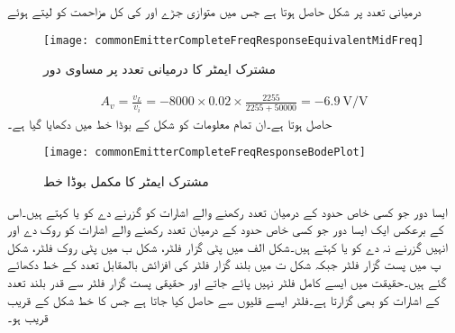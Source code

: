 درمیانی تعدد پر شکل  حاصل ہوتا ہے جس میں متوازی جڑے  اور  کی کل مزاحمت کو  لیتے ہوئے
\begin{figure}
\centering
\texttt{[image: commonEmitterCompleteFreqResponseEquivalentMidFreq]}
\caption{مشترک ایمٹر کا درمیانی تعدد پر مساوی دور}
\label{شکل_تعددی_ردعمل_مشترک_مخارج_مکمل_تعددی_ردعمل_درمیانی_تعددی_مساوی}
\end{figure}
\begin{align*}
A_v=\frac{v_L}{v_i}=-8000 \times 0.02 \times \frac{2255}{2255+50000}=\SI{-6.9}{\volt \per \volt}
\end{align*}
حاصل ہوتا ہے۔ان تمام معلومات کو شکل  کے بوڈا خط میں دکھایا گیا ہے۔ 
\begin{figure}
\centering
\texttt{[image: commonEmitterCompleteFreqResponseBodePlot]}
\caption{مشترک ایمٹر کا مکمل بوڈا خط}
\label{شکل_تعددی_ردعمل_مشترک_مخارج_مکمل_تعددی_ردعمل_مکمل_بوڈا_خط}
\end{figure}
ایسا دور جو کسی خاص حدود کے درمیان تعدد رکھنے والے اشارات کو گزرنے دے کو  یا   کہتے ہیں۔اس کے برعکس ایک ایسا دور جو کسی خاص حدود کے درمیان تعدد رکھنے والے اشارات کو روک دے اور انہیں گزرنے نہ دے کو  یا   کہتے ہیں۔شکل  الف میں پٹی گزار فلٹر، شکل  ب میں پٹی روک فلٹر، شکل  پ میں پست گزار فلٹر جبکہ شکل  ت میں بلند گزار فلٹر  کی افزائش بالمقابل تعدد  کے خط دکھائے گئے ہیں۔حقیقت میں ایسے کامل فلٹر نہیں پائے جاتے اور حقیقی  پست گزار فلٹر  سے قدر بلند تعدد کے اشارات کو بھی گزارتا ہے۔فلٹر ایسے قلیوں سے حاصل کیا جاتا ہے جس کا خط شکل  کے قریب قریب ہو۔

